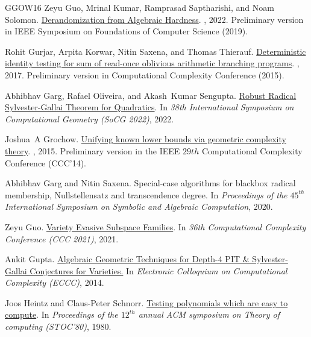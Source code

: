 \documentclass[10pt,a4paper]{article}
\numberwithin{equation}{section}
\begin{document}
\begin{thebibliography}{GGOW16}
Zeyu Guo, Mrinal Kumar, Ramprasad Saptharishi, and Noam Solomon.
\newblock \href {http://dx.doi.org/10.1137/20M1347395} {Derandomization from
  Algebraic Hardness}.
, 2022.
\newblock Preliminary version in IEEE Symposium on Foundations of Computer Science (2019).

Rohit Gurjar, Arpita Korwar, Nitin Saxena, and Thomas Thierauf.
\newblock
  \href{https://link.springer.com/article/10.1007/s00037-016-0141-z}{Deterministic
  identity testing for sum of read-once oblivious arithmetic branching
  programs}.
, 2017.
\newblock Preliminary version in Computational Complexity Conference (2015).

Abhibhav Garg, Rafael Oliveira, and Akash~Kumar Sengupta.
\newblock \href {http://dx.doi.org/10.4230/LIPIcs.SoCG.2022.42} {{Robust
  Radical Sylvester-Gallai Theorem for Quadratics}}.
\newblock In {\em 38th International Symposium on Computational Geometry (SoCG
  2022)}, 2022.

Joshua~A Grochow.
\newblock
  \href{https://link.springer.com/article/10.1007/s00037-015-0103-x}{Unifying
  known lower bounds via geometric complexity theory}.
, 2015.
\newblock Preliminary version in the {IEEE} $29{th}$ Computational Complexity
  Conference (CCC'14).

Abhibhav Garg and Nitin Saxena.
\newblock Special-case algorithms for blackbox radical membership,
  {N}ullstellensatz and transcendence degree.
\newblock In {\em Proceedings of the $45^{th}$ International Symposium on
  Symbolic and Algebraic Computation}, 2020.

Zeyu Guo.
\newblock \href{https://zeyuguo.bitbucket.io/papers/chow.pdf}{Variety Evasive
  Subspace Families}.
\newblock In {\em 36th Computational Complexity Conference (CCC 2021)}, 2021.

Ankit Gupta.
\newblock \href{https://eccc.weizmann.ac.il/report/2014/130/}{Algebraic
  Geometric Techniques for Depth-4 PIT \& Sylvester-Gallai Conjectures for
  Varieties.}
\newblock In {\em Electronic Colloquium on Computational Complexity (ECCC)},
  2014.

Joos Heintz and Claus-Peter Schnorr.
\newblock \href{https://dl.acm.org/doi/10.1145/800141.804674}{Testing
  polynomials which are easy to compute}.
\newblock In {\em Proceedings of the $12^{th}$ annual ACM symposium on Theory
  of computing (STOC'80)}, 1980.


\end{thebibliography}
\end{document}
